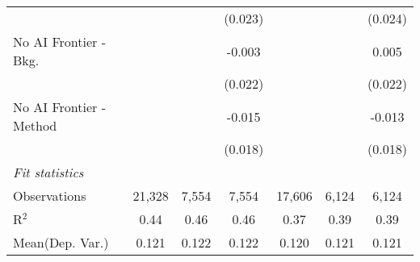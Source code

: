 \begin{tabular}{lcccccc}
                           &              &         & (0.023)      &              &         & (0.024)\\   
   No AI Frontier - Bkg.   &              &         & -0.003       &              &         & 0.005\\   
                           &              &         & (0.022)      &              &         & (0.022)\\   
   No AI Frontier - Method &              &         & -0.015       &              &         & -0.013\\   
                           &              &         & (0.018)      &              &         & (0.018)\\   
   \midrule
   \emph{Fit statistics}\\
   Observations            & 21,328       & 7,554   & 7,554        & 17,606       & 6,124   & 6,124\\  
   R$^2$                   & 0.44         & 0.46    & 0.46         & 0.37         & 0.39    & 0.39\\  
Mean(Dep. Var.) & 0.121 & 0.122 & 0.122 & 0.120 & 0.121 & 0.121 \\
   

\end{tabular}
